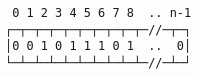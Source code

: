 \documentclass[varwidth,crop]{standalone}
\begin{document}
\begin{verbatim}
 0 1 2 3 4 5 6 7 8  .. n-1
┌─┬─┬─┬─┬─┬─┬─┬─┬─┬─//─┬─┐
│0 0 1 0 1 1 1 0 1  ..  0│
└─┴─┴─┴─┴─┴─┴─┴─┴─┴─//─┴─┘
\end{verbatim}
\end{document}
